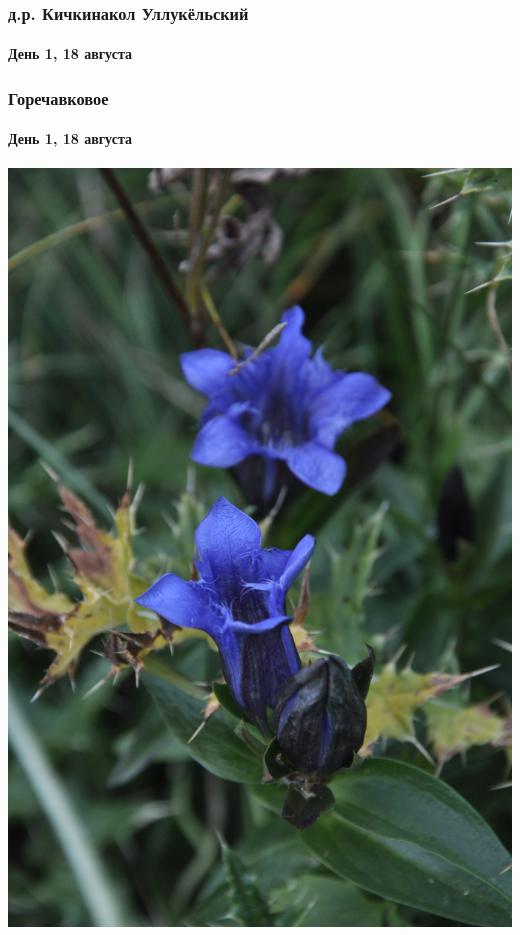 \begin{frame}
	\frametitle{д.р. Кичкинакол Уллукёльский}
	\framesubtitle{День 1, 18 августа}
	\centering
\end{frame}

\begin{frame}
	\frametitle{Горечавковое}
	\framesubtitle{День 1, 18 августа}
	\centering
	\includegraphics[width=\linewidth]{../pics/DSC_0585}
\end{frame}